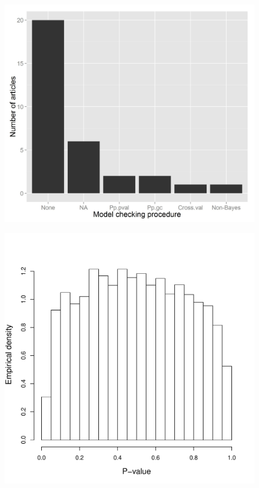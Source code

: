 \documentclass[12pt,english]{article}
\begin{document}
\begin{spacing}{1.9}
\begin{figure}
\begin{center}
\includegraphics[width=170mm]{WOSsearch.jpeg}
\caption{} \label{fig:WOS}
\end{center}
\end{figure}

\begin{figure}
\begin{center}
\includegraphics[width=170mm]{Pval_hist.pdf}
\caption{} \label{fig:pval}
\end{center}
\end{figure}

\end{spacing}
\end{document}
